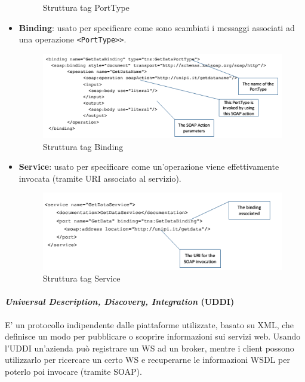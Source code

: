 \documentclass{article}
\newcommand*{\xml}[1]{\texttt{<#1>}}
\begin{document}
\begin{itemize}
\begin{figure}[H]
        \caption{Struttura tag PortType}
        \end{figure}
    \item \textbf{Binding}: usato per specificare come sono scambiati i messaggi associati ad una operazione \xml{PortType>}.
        \begin{figure}[H]
        \centering
        \includegraphics[scale=0.8]{img/wsdlBinding.png}
        \caption{Struttura tag Binding}
        \end{figure}
    \item \textbf{Service}: usato per specificare come un'operazione viene effettivamente invocata (tramite URI associato al servizio).
        \begin{figure}[H]
        \centering
        \includegraphics[scale=0.8]{img/wsdlServiceField.png}
        \caption{Struttura tag Service}
        \end{figure}
\end{itemize}

\paragraph{\textit{Universal Description, Discovery, Integration} (UDDI)} 
E' un protocollo indipendente dalle piattaforme utilizzate, basato su XML, che definisce un modo per pubblicare o scoprire informazioni sui servizi web. Usando l'UDDI un'azienda può registrare un WS ad un broker, mentre i client possono utilizzarlo per ricercare un certo WS e recuperarne le informazioni WSDL per poterlo poi invocare (tramite SOAP).
\end{document}

